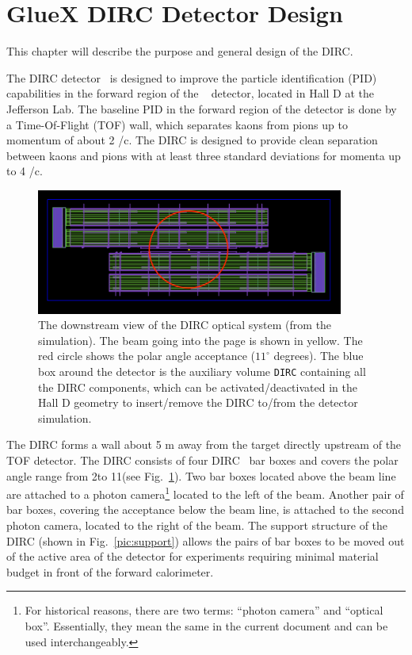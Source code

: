 \section{GlueX DIRC Detector Design}

This chapter will describe the purpose and general design of the \gluex DIRC.
\vspace{0.5cm}

The \gluex DIRC detector~\cite{dirc} is designed to improve the particle identification (PID) capabilities in the forward region of the \gluex~\cite{gluex1, gluex2} detector, located in Hall D at the Jefferson Lab. The baseline PID in the forward region of the \gluex detector is done by a Time-Of-Flight (TOF) wall, which separates kaons from pions up to momentum of about 2 \gev/c. The \gluex DIRC is designed to provide clean separation between kaons and pions with at least three standard deviations for momenta up to 4 \gev/c.

\begin{figure}[!htb]
\centering
\includegraphics[width=0.9\textwidth]{pics/sim1.png}
\caption{\label{pic:sim}
The downstream view of the \gluex DIRC optical system (from the simulation). The beam going into the page is shown in yellow. The red circle shows the polar angle acceptance ($11^{\circ}$ degrees).
The blue box around the detector is the auxiliary volume \texttt{DIRC} containing all the DIRC components, which can be activated/deactivated in the Hall D geometry to insert/remove the \gluex DIRC to/from the \gluex detector simulation.}
\end{figure}

The \gluex DIRC forms a wall about 5 m away from the target directly upstream of the TOF detector. The DIRC consists of four \babar DIRC~\cite{bdirc1} bar boxes and covers the polar angle range from 2\mydeg to 11\mydeg (see Fig.~\ref{pic:sim}). Two bar boxes located above the beam line are attached to a photon camera\footnote{For historical reasons, there are two terms: ``photon camera'' and ``optical box''. Essentially, they mean the same in the current document and can be used interchangeably.} located to the left of the beam. Another pair of bar boxes, covering the acceptance below the beam line, is attached to the second photon camera, located to the right of the beam. The support structure of the DIRC (shown in Fig.~\ref{pic:support}) allows the pairs of bar boxes to be moved out of the active area of the detector for experiments requiring minimal material budget in front of the forward calorimeter.

